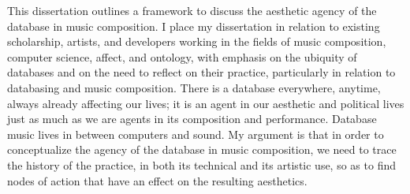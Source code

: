 This dissertation outlines a framework to discuss the aesthetic agency of the database in music composition. I place my dissertation in relation to existing scholarship, artists, and developers working in the fields of music composition, computer science, affect, and ontology, with emphasis on the ubiquity of databases and on the need to reflect on their practice, particularly in relation to databasing and music composition. There is a database everywhere, anytime, always already affecting our lives; it is an agent in our aesthetic and political lives just as much as we are agents in its composition and performance. Database music lives in between computers and sound. My argument is that in order to conceptualize the agency of the database in music composition, we need to trace the history of the practice, in both its technical and its artistic use, so as to find nodes of action that have an effect on the resulting aesthetics.
